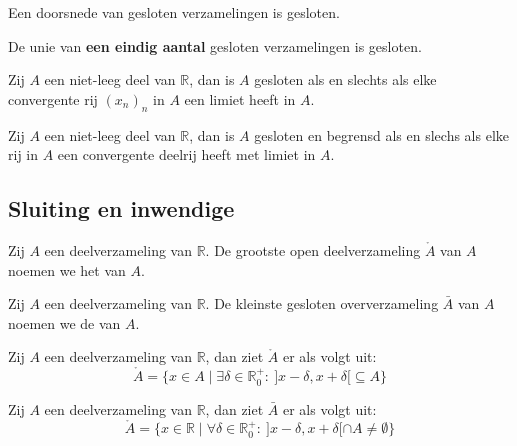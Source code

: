 \documentclass[main.tex]{subfiles}
\begin{document}
\begin{pr}
  Een doorsnede van gesloten verzamelingen is gesloten.
\end{pr}

\begin{pr}
  De unie van \textbf{een eindig aantal} gesloten verzamelingen is gesloten.
\end{pr}

\begin{pr}
  Zij $A$ een niet-leeg deel van $\mathbb{R}$, dan is $A$ gesloten als en slechts als elke convergente rij $(x_{n})_{n}$ in $A$ een limiet heeft in $A$.
\end{pr}

\begin{pr}
  Zij $A$ een niet-leeg deel van $\mathbb{R}$, dan is $A$ gesloten en begrensd als en slechs als elke rij in $A$ een convergente deelrij heeft met limiet in $A$.
\end{pr}

\subsection{Sluiting en inwendige}
\label{sec:sluit-en-inwend}

\begin{de}
  Zij $A$ een deelverzameling van $\mathbb{R}$.
  De grootste open deelverzameling $\mathring{A}$ van $A$ noemen we het  van $A$.
\end{de}

\begin{de}
  Zij $A$ een deelverzameling van $\mathbb{R}$.
  De kleinste gesloten oververzameling $\bar{A}$ van $A$ noemen we de  van $A$.
\end{de}


 
\begin{pr}
  Zij $A$ een deelverzameling van $\mathbb{R}$, dan ziet $\mathring{A}$ er als volgt uit:
  \[ \mathring{A} = \{ x\in A\mid \exists \delta \in \mathbb{R}_{0}^{+}:\ ]x-\delta,x+\delta[ \subseteq A \} \]
\end{pr}

\begin{pr}
  Zij $A$ een deelverzameling van $\mathbb{R}$, dan ziet $\bar{A}$ er als volgt uit:
  \[ \mathring{A} = \{ x\in \mathbb{R} \mid \forall \delta \in \mathbb{R}_{0}^{+}:\ ]x-\delta, x+\delta[ \cap A \neq \emptyset \} \]
\end{pr}
\end{document}
